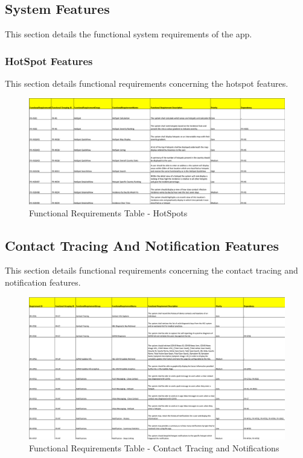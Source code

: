 \documentclass{scrreprt}
\begin{document}
\subsection{System Features}
This section details the functional system requirements of the app.
\subsubsection{HotSpot Features}
This section details functional requirements concerning the hotspot features.
\begin{figure}[H]
	\centering
	\includegraphics[page=1, width=0.95\linewidth]{COMP30830-FunctionalRequirements-Hot}
	\caption{Functional Requirements Table - HotSpots}
	\label{FR}
\end{figure}

\subsection{Contact Tracing And Notification Features}
This section details functional requirements concerning the contact tracing and notification features.
\begin{figure}[H]
	\centering
	\includegraphics[page=1, width=0.95\linewidth]{COMP30830-FunctionalRequirements-CT}
	\caption{Functional Requirements Table - Contact Tracing and Notifications}
	\label{FR}
\end{figure}
\end{document}
